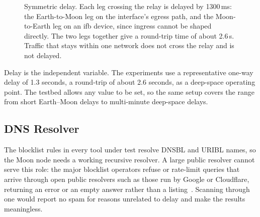 \begin{figure}[ht]
\centering
{}
\caption{Symmetric delay. Each leg crossing the relay is delayed by 1300\,ms: the
Earth-to-Moon leg on the interface's egress path, and the Moon-to-Earth leg on an
ifb device, since ingress cannot be shaped directly. The two legs together give a
round-trip time of about 2.6\,s. Traffic that stays within one network does not cross
the relay and is not delayed.}
\label{fig:ifb}
\end{figure}

Delay is the independent variable. The experiments use a representative one-way delay of 1.3 seconds, a round-trip of about 2.6 seconds, as a deep-space operating point. The testbed allows any value to be set, so the same setup covers the range from short Earth–Moon delays to multi-minute deep-space delays.

\subsection{DNS Resolver}

The blocklist rules in every tool under test resolve DNSBL and URIBL names, so
the Moon node needs a working recursive resolver. A large public resolver cannot
serve this role: the major blocklist operators refuse or rate-limit queries that
arrive through open public resolvers such as those run by Google or Cloudflare,
returning an error or an empty answer rather than a listing~\cite{spamhaus}.
Scanning through one would report no spam for reasons unrelated to delay and make
the results meaningless.


